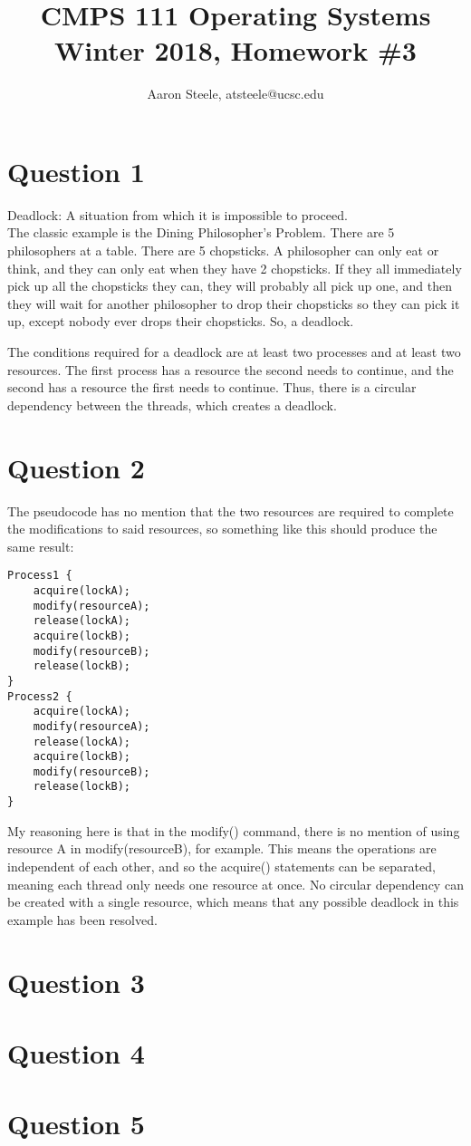 \documentclass[12pt]{article}
\title{\textbf{CMPS 111 Operating Systems\\ Winter 2018, Homework \#3}}
\date{}
\author{Aaron Steele, atsteele@ucsc.edu}
\begin{document}
	
	\maketitle
	
	\section*{Question 1}
	Deadlock: A situation from which it is impossible to proceed.\\
	The classic example is the Dining Philosopher's Problem. There are 5 philosophers at a table. There are 5 chopsticks. A philosopher can only eat or think, and they can only eat when they have 2 chopsticks. If they all immediately pick up all the chopsticks they can, they will probably all pick up one, and then they will wait for another philosopher to drop their chopsticks so they can pick it up, except nobody ever drops their chopsticks. So, a deadlock.
	
	The conditions required for a deadlock are at least two processes and at least two resources. The first process has a resource the second needs to continue, and the second has a resource the first needs to continue. Thus, there is a circular dependency between the threads, which creates a deadlock.
	
	
	\section*{Question 2}
	The pseudocode has no mention that the two resources are required to complete the modifications to said resources, so something like this should produce the same result:
	
	\begin{Verbatim}
Process1 {
	acquire(lockA);
	modify(resourceA);
	release(lockA);
	acquire(lockB);
	modify(resourceB);
	release(lockB);
}
Process2 {
	acquire(lockA);
	modify(resourceA);
	release(lockA);
	acquire(lockB);
	modify(resourceB);
	release(lockB);	
}
	\end{Verbatim}
	
	My reasoning here is that in the modify() command, there is no mention of using resource A in modify(resourceB), for example. This means the operations are independent of each other, and so the acquire() statements can be separated, meaning each thread only needs one resource at once. No circular dependency can be created with a single resource, which means that any possible deadlock in this example has been resolved.
	
	
	\section*{Question 3}
	
	
	\section*{Question 4}

	
	
	\section*{Question 5}	

	
\end{document}

